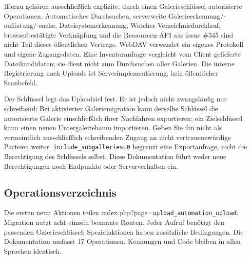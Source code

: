 \documentclass[11pt,a4paper]{article}
\newcommand{\codeword}[1]{\nolinkurl{#1}}
\begin{document}
Hierzu gehören ausschließlich explizite, durch einen Galerieschlüssel autorisierte
Operationen. Automatisches Durchsuchen, serverweite Galerieerkennung/-auflistung/-suche,
Dateisystemerkennung, Watcher-Verzeichnisdurchlauf, browserbestätigte Verknüpfung und die
Ressourcen-API aus Issue \#345 sind nicht Teil dieses öffentlichen Vertrags. WebDAV
verwendet ein eigenes Protokoll und eigene Zugangsdaten. Eine Inventaranfrage vergleicht vom
Client gelieferte Dateikandidaten; sie dient nicht zum Durchsuchen aller Galerien. Die
interne Registrierung nach Uploads ist Serverimplementierung, kein öffentlicher Scanbefehl.

Der Schlüssel legt das Uploadziel fest. Er ist jedoch nicht zwangsläufig nur schreibend: Bei
aktivierter Galeriemigration kann derselbe Schlüssel die autorisierte Galerie einschließlich
ihrer Nachfahren exportieren; ein Zielschlüssel kann einen neuen Untergaleriebaum
importieren. Geben Sie ihn nicht als vermeintlich ausschließlich schreibenden Zugang an
nicht vertrauenswürdige Parteien weiter. \codeword{include_subgalleries=0} begrenzt eine
Exportanfrage, nicht die Berechtigung des Schlüssels selbst. Diese Dokumentation führt weder
neue Berechtigungen noch Endpunkte oder Serververhalten ein.

\subsection{\texorpdfstring{Operationsverzeichnis}{Operationsverzeichnis}}

\label{api352:operation-index}

Die ersten neun Aktionen teilen index.php?page=\codeword{upload_automation_upload}.
Migration nutzt acht einzeln benannte Routen. Jeder Aufruf benötigt den passenden
Galerieschlüssel; Spezialaktionen haben zusätzliche Bedingungen. Die Dokumentation umfasst
17 Operationen. Kennungen und Code bleiben in allen Sprachen identisch.
\end{document}
